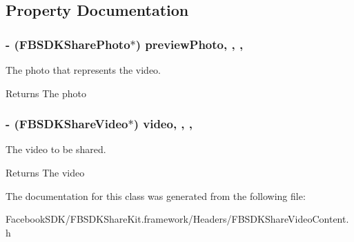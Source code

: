 \subsection{Property Documentation}
\hypertarget{interface_f_b_s_d_k_share_video_content_a3a4422e8ca98246301cd55ecf6689e8b}{
\subsubsection[{preview\-Photo}]{\setlength{\rightskip}{0pt plus 5cm}-\/ ({\bf F\-B\-S\-D\-K\-Share\-Photo}$\ast$) preview\-Photo\hspace{0.3cm}{\ttfamily [read]}, {\ttfamily [write]}, {\ttfamily [nonatomic]}, {\ttfamily [copy]}}}\label{interface_f_b_s_d_k_share_video_content_a3a4422e8ca98246301cd55ecf6689e8b}
The photo that represents the video. \begin{DoxyReturn}{Returns}
The photo 
\end{DoxyReturn}
\hypertarget{interface_f_b_s_d_k_share_video_content_a7808add937d3fe59f3589e9e48d04612}{
\subsubsection[{video}]{\setlength{\rightskip}{0pt plus 5cm}-\/ ({\bf F\-B\-S\-D\-K\-Share\-Video}$\ast$) video\hspace{0.3cm}{\ttfamily [read]}, {\ttfamily [write]}, {\ttfamily [nonatomic]}, {\ttfamily [copy]}}}\label{interface_f_b_s_d_k_share_video_content_a7808add937d3fe59f3589e9e48d04612}
The video to be shared. \begin{DoxyReturn}{Returns}
The video 
\end{DoxyReturn}


The documentation for this class was generated from the following file\-:\begin{DoxyCompactItemize}
\item 
Facebook\-S\-D\-K/\-F\-B\-S\-D\-K\-Share\-Kit.\-framework/\-Headers/F\-B\-S\-D\-K\-Share\-Video\-Content.\-h\end{DoxyCompactItemize}
